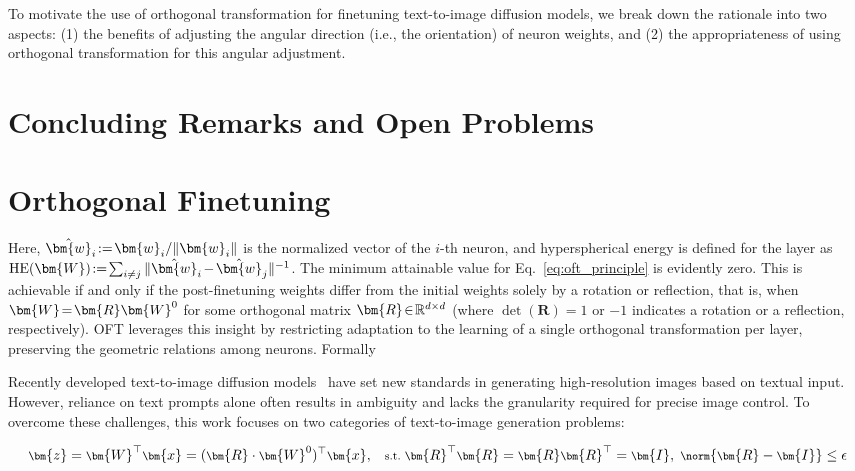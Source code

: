 \begin{itemize}[leftmargin=*,nosep]
To motivate the use of orthogonal transformation for finetuning text-to-image diffusion models, we break down the rationale into two aspects: (1) the benefits of adjusting the angular direction (i.e., the orientation) of neuron weights, and (2) the appropriateness of using orthogonal transformation for this angular adjustment.

\section{Concluding Remarks and Open Problems}

\section{Orthogonal Finetuning}

Here, $\thickmuskip=2mu \medmuskip=2mu \hat{\bm{w}}_i:=\bm{w}_i/\|\bm{w}_i\|$ is the normalized vector of the $i$-th neuron, and hyperspherical energy is defined for the layer as $\thickmuskip=2mu \medmuskip=2mu \text{HE}(\bm{W}):= \sum_{i\neq j} \|\hat{\bm{w}}_i-\hat{\bm{w}}_j\|^{-1}$. The minimum attainable value for Eq.~\eqref{eq:oft_principle} is evidently zero. This is achievable if and only if the post-finetuning weights differ from the initial weights solely by a rotation or reflection, that is, when $\thickmuskip=2mu \medmuskip=2mu \bm{W}=\bm{R}\bm{W}^0$ for some orthogonal matrix $\thickmuskip=2mu \medmuskip=2mu \bm{R}\in\mathbb{R}^{d\times d}$ (where $\det(\bm{R})=1$ or $-1$ indicates a rotation or a reflection, respectively). OFT leverages this insight by restricting adaptation to the learning of a single orthogonal transformation per layer, preserving the geometric relations among neurons. Formally

Recently developed text-to-image diffusion models~\cite{saharia2022photorealistic,ramesh2022hierarchical,rombach2022high} have set new standards in generating high-resolution images based on textual input. However, reliance on text prompts alone often results in ambiguity and lacks the granularity required for precise image control. To overcome these challenges, this work focuses on two categories of text-to-image generation problems:

\begin{equation}\label{eq:coft_general}
    \footnotesize
    \bm{z}=\bm{W}^\top\bm{x}=(\bm{R}\cdot\bm{W}^0)^\top\bm{x},~~~\text{s.t.}~\bm{R}^\top\bm{R}=\bm{R}\bm{R}^\top=\bm{I},~\norm{\bm{R}-\bm{I}}\leq \epsilon
\end{equation}


\end{itemize}
